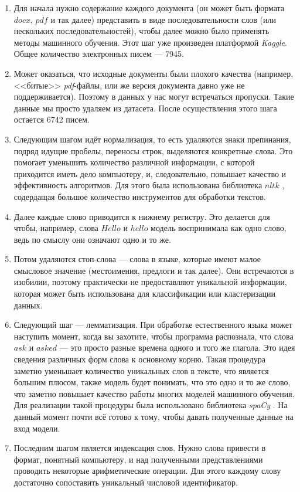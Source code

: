 \begin{enumerate}

\item
Для начала нужно содержание каждого документа (он может быть формата $docx$, $pdf$ и так далее) представить в виде последовательности слов (или нескольких последовательностей), чтобы далее можно было применять методы машинного обучения. Этот шаг уже произведен платформой \textit{Kaggle}. Общее количество электронных писем --- 7945.

\item Может оказаться, что исходные документы были плохого качества (например, <<битые>> 
\textit{pdf}-файлы, или же версия документа давно уже не поддерживается). Поэтому в данных
у нас могут встречаться пропуски. Такие данные мы просто удаляем из датасета. После осуществления этого шага остается 6742 писем. 

\item Следующим шагом идёт нормализация, то есть удаляются знаки препинания, подряд идущие пробелы, переносы строк, выделяются конкретные слова. Это помогает уменьшить количество различной информации, с которой приходится иметь дело компьютеру, и, следовательно, повышает
качество и эффективность алгоритмов. Для этого была использована 
библиотека $nltk$ \cite{nltkk}, 
содердащая большое количество инструментов для обработки текстов.

\item Далее каждые слово приводится к нижнему регистру. Это делается для чтобы, например,
слова $Hello$ и $hello$ модель воспринимала как одно слово, ведь по смыслу они означают
одно и то же.

\item Потом удаляются стоп-слова --- слова в языке, которые имеют малое смысловое значение (местоимения, предлоги и так далее). Они встречаются в изобилии, поэтому практически не предоставляют уникальной информации, которая может быть использована для классификации или кластеризации данных. 

\item Следующий шаг --- лемматизация. При обработке естественного языка может наступить момент, когда вы захотите, чтобы программа распознала, что слова $ask$ и $asked$ --- это просто разные времена одного и того же глагола. Это идея сведения различных форм слова к основному корню. Такая процедура заметно уменьшает количество уникальных слов в тексте, что
является большим плюсом, также модель будет понимать, что это одно и то же слово, что 
заметно повышает качество работы многих моделей машинного обучения. Для реализации такой процедуры была использовано библиотека \textit{spaCy} \cite{bib3}. На данный момент почти
всё готово к тому, чтобы давать полученные данные на вход модели.

\item Последним шагом является индексация слов. Нужно слова привести в формат, понятный 
компьютеру, и над полученными представлениями проводить некоторые арифметические операции. Для этого каждому слову достаточно сопоставить уникальный числовой идентификатор.
 
\end{enumerate}

